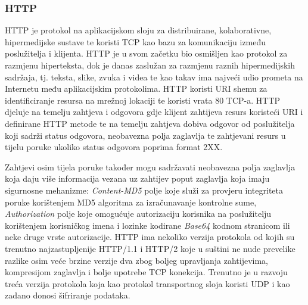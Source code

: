 \documentclass[times, utf8, diplomski]{fer}
\begin{document}
\subsubsection{HTTP}
HTTP  je protokol na aplikacijskom sloju za distribuirane, kolaborativne, hipermedijske sustave te koristi TCP kao bazu za komunikaciju između poslužitelja i klijenta. HTTP je u svom začetku bio osmišljen kao protokol za razmjenu hiperteksta, dok je danas zaslužan za razmjenu raznih hipermedijskih sadržaja, tj. teksta, slike, zvuka i videa te kao takav ima najveći udio prometa na Internetu među aplikacijskim protokolima. HTTP koristi URI  shemu za identificiranje resursa na mrežnoj lokaciji te koristi vrata 80 TCP-a. HTTP djeluje na temelju zahtjeva i odgovora gdje klijent zahtijeva resurs koristeći URI i definirane HTTP metode te na temelju zahtjeva dobiva odgovor od poslužitelja koji sadrži status odgovora, neobavezna polja zaglavlja te zahtjevani resurs u tijelu poruke ukoliko status odgovora poprima format 2XX. 

Zahtjevi osim tijela poruke također mogu sadržavati neobavezna polja zaglavlja koja daju više informacija vezana uz zahtijev poput zaglavlja koja imaju sigurnosne mehanizme: \emph{Content-MD5} polje koje služi za provjeru integriteta poruke korištenjem MD5 algoritma za izračunavanje kontrolne sume, \emph{Authorization} polje koje omogućuje autorizaciju korisnika na poslužitelju korištenjem korisničkog imena i lozinke kodirane \emph{Base64} kodnom stranicom ili neke druge vrste autorizacije. HTTP ima nekoliko verzija protokola od kojih su trenutno najzastupljenije HTTP/1.1 i HTTP/2 koje u suštini ne nude prevelike razlike osim veće brzine verzije dva zbog boljeg upravljanja zahtijevima, kompresijom zaglavlja i bolje upotrebe TCP konekcija. Trenutno je u razvoju treća verzija protokola koja kao protokol transportnog sloja koristi UDP i kao zadano donosi šifriranje podataka.
\end{document}
